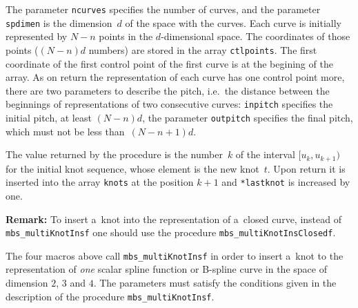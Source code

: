 \begin{sloppypar}
The parameter \texttt{ncurves} specifies the number of curves, and the
parameter \texttt{spdimen} is the dimension~$d$ of the space with the curves.
Each curve is initially represented by $N-n$ points
in the $d$-dimensional space.
The coordinates of those points ($(N-n)d$ numbers)
are stored in the array \texttt{ctlpoints}. The first coordinate of the first
control point of the first curve is at the begining of the array.
As on return the representation of each curve has one control point more,
there are two parameters to describe the pitch, i.e.\ the distance between
the beginnings of representations of two consecutive curves:
\texttt{inpitch} specifies the initial pitch, at least $(N-n)d$,
the parameter \texttt{outpitch} specifies the final pitch, which must not
be less than~$(N-n+1)d$.
\end{sloppypar}

The value returned by the procedure is the number~$k$ of the interval $[u_k,u_{k+1})$
for the initial knot sequence, whose element is the new knot~$t$.
Upon return it is inserted into the array \texttt{knots} at the position
$k+1$ and \texttt{*lastknot} is increased by one.

\vspace{\medskipamount}
\noindent
\textbf{Remark:} To insert a~knot into the representation of a~closed curve,
instead of \texttt{mbs\_multiKnotInsf} one should use the procedure
\texttt{mbs\_multiKnotInsClosedf}.


\vspace{\bigskipamount}
The four macros above call \texttt{mbs\_multiKnotInsf} in order to insert
a~knot to the representation of \emph{one} scalar spline function or
B-spline curve in the space of dimension $2$, $3$ and $4$.
The parameters must satisfy the conditions given in the description of
the procedure \texttt{mbs\_multiKnotInsf}.

